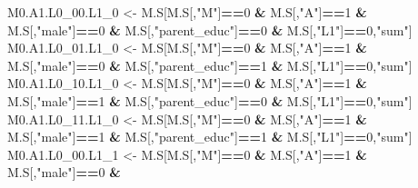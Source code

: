 \documentclass[
]{book}
\newenvironment{Shaded}{\begin{snugshade}}{\end{snugshade}}
\newcommand{\DecValTok}[1]{\textcolor[rgb]{0.00,0.00,0.81}{#1}}
\newcommand{\NormalTok}[1]{#1}
\newcommand{\OtherTok}[1]{\textcolor[rgb]{0.56,0.35,0.01}{#1}}
\newcommand{\SpecialCharTok}[1]{\textcolor[rgb]{0.81,0.36,0.00}{\textbf{#1}}}
\newcommand{\StringTok}[1]{\textcolor[rgb]{0.31,0.60,0.02}{#1}}
\begin{document}
\begin{Shaded}
\begin{Highlighting}[]
\NormalTok{  M0.A1.L0\_00.L1\_0 }\OtherTok{\textless{}{-}}\NormalTok{ M.S[M.S[,}\StringTok{"M"}\NormalTok{]}\SpecialCharTok{==}\DecValTok{0} \SpecialCharTok{\&}\NormalTok{ M.S[,}\StringTok{"A"}\NormalTok{]}\SpecialCharTok{==}\DecValTok{1} \SpecialCharTok{\&}\NormalTok{ M.S[,}\StringTok{"male"}\NormalTok{]}\SpecialCharTok{==}\DecValTok{0} \SpecialCharTok{\&} 
\NormalTok{                            M.S[,}\StringTok{"parent\_educ"}\NormalTok{]}\SpecialCharTok{==}\DecValTok{0} \SpecialCharTok{\&}\NormalTok{ M.S[,}\StringTok{"L1"}\NormalTok{]}\SpecialCharTok{==}\DecValTok{0}\NormalTok{,}\StringTok{"sum"}\NormalTok{]}
\NormalTok{  M0.A1.L0\_01.L1\_0 }\OtherTok{\textless{}{-}}\NormalTok{ M.S[M.S[,}\StringTok{"M"}\NormalTok{]}\SpecialCharTok{==}\DecValTok{0} \SpecialCharTok{\&}\NormalTok{ M.S[,}\StringTok{"A"}\NormalTok{]}\SpecialCharTok{==}\DecValTok{1} \SpecialCharTok{\&}\NormalTok{ M.S[,}\StringTok{"male"}\NormalTok{]}\SpecialCharTok{==}\DecValTok{0} \SpecialCharTok{\&} 
\NormalTok{                            M.S[,}\StringTok{"parent\_educ"}\NormalTok{]}\SpecialCharTok{==}\DecValTok{1} \SpecialCharTok{\&}\NormalTok{ M.S[,}\StringTok{"L1"}\NormalTok{]}\SpecialCharTok{==}\DecValTok{0}\NormalTok{,}\StringTok{"sum"}\NormalTok{]}
\NormalTok{  M0.A1.L0\_10.L1\_0 }\OtherTok{\textless{}{-}}\NormalTok{ M.S[M.S[,}\StringTok{"M"}\NormalTok{]}\SpecialCharTok{==}\DecValTok{0} \SpecialCharTok{\&}\NormalTok{ M.S[,}\StringTok{"A"}\NormalTok{]}\SpecialCharTok{==}\DecValTok{1} \SpecialCharTok{\&}\NormalTok{ M.S[,}\StringTok{"male"}\NormalTok{]}\SpecialCharTok{==}\DecValTok{1} \SpecialCharTok{\&} 
\NormalTok{                            M.S[,}\StringTok{"parent\_educ"}\NormalTok{]}\SpecialCharTok{==}\DecValTok{0} \SpecialCharTok{\&}\NormalTok{ M.S[,}\StringTok{"L1"}\NormalTok{]}\SpecialCharTok{==}\DecValTok{0}\NormalTok{,}\StringTok{"sum"}\NormalTok{]}
\NormalTok{  M0.A1.L0\_11.L1\_0 }\OtherTok{\textless{}{-}}\NormalTok{ M.S[M.S[,}\StringTok{"M"}\NormalTok{]}\SpecialCharTok{==}\DecValTok{0} \SpecialCharTok{\&}\NormalTok{ M.S[,}\StringTok{"A"}\NormalTok{]}\SpecialCharTok{==}\DecValTok{1} \SpecialCharTok{\&}\NormalTok{ M.S[,}\StringTok{"male"}\NormalTok{]}\SpecialCharTok{==}\DecValTok{1} \SpecialCharTok{\&} 
\NormalTok{                            M.S[,}\StringTok{"parent\_educ"}\NormalTok{]}\SpecialCharTok{==}\DecValTok{1} \SpecialCharTok{\&}\NormalTok{ M.S[,}\StringTok{"L1"}\NormalTok{]}\SpecialCharTok{==}\DecValTok{0}\NormalTok{,}\StringTok{"sum"}\NormalTok{]}
\NormalTok{  M0.A1.L0\_00.L1\_1 }\OtherTok{\textless{}{-}}\NormalTok{ M.S[M.S[,}\StringTok{"M"}\NormalTok{]}\SpecialCharTok{==}\DecValTok{0} \SpecialCharTok{\&}\NormalTok{ M.S[,}\StringTok{"A"}\NormalTok{]}\SpecialCharTok{==}\DecValTok{1} \SpecialCharTok{\&}\NormalTok{ M.S[,}\StringTok{"male"}\NormalTok{]}\SpecialCharTok{==}\DecValTok{0} \SpecialCharTok{\&} 

\end{Highlighting}
\end{Shaded}
\end{document}
